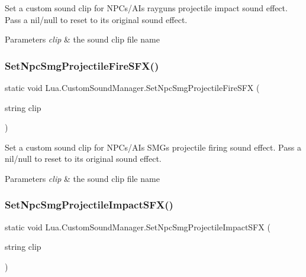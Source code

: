 Set a custom sound clip for N\+P\+Cs/\+A\+Is raygun\textquotesingle{}s projectile impact sound effect. Pass a nil/null to reset to its original sound effect. 


\begin{DoxyParams}{Parameters}
{\em clip} & the sound clip file name\\
\hline
\end{DoxyParams}
\mbox{\label{class_lua_1_1_custom_sound_manager_a98258d37f9bfcd6d0ca5a53974629ab7}} 
\subsubsection{\texorpdfstring{SetNpcSmgProjectileFireSFX()}{SetNpcSmgProjectileFireSFX()}}
{\footnotesize\ttfamily static void Lua.\+Custom\+Sound\+Manager.\+Set\+Npc\+Smg\+Projectile\+Fire\+S\+FX (\begin{DoxyParamCaption}\item[{string}]{clip }\end{DoxyParamCaption})\hspace{0.3cm}{\ttfamily [static]}}



Set a custom sound clip for N\+P\+Cs/\+A\+Is S\+MG\textquotesingle{}s projectile firing sound effect. Pass a nil/null to reset to its original sound effect. 


\begin{DoxyParams}{Parameters}
{\em clip} & the sound clip file name\\
\hline
\end{DoxyParams}
\mbox{\label{class_lua_1_1_custom_sound_manager_ac2be140403d813db6f58549e8e1ec024}} 
\subsubsection{\texorpdfstring{SetNpcSmgProjectileImpactSFX()}{SetNpcSmgProjectileImpactSFX()}}
{\footnotesize\ttfamily static void Lua.\+Custom\+Sound\+Manager.\+Set\+Npc\+Smg\+Projectile\+Impact\+S\+FX (\begin{DoxyParamCaption}\item[{string}]{clip }\end{DoxyParamCaption})\hspace{0.3cm}{\ttfamily [static]}}




